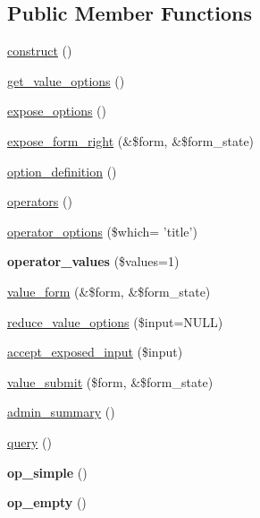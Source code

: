 \subsection*{Public Member Functions}
\begin{CompactItemize}
\item 
\hyperlink{classviews__handler__filter__in__operator_1ec0f531f2c590ef15468ae06c5d0284}{construct} ()
\item 
\hyperlink{classviews__handler__filter__in__operator_a5b5df6d90f4359ed28c0c446bdc81a6}{get\_\-value\_\-options} ()
\item 
\hyperlink{classviews__handler__filter__in__operator_0ed328117721ce41a3744f0339c16527}{expose\_\-options} ()
\item 
\hyperlink{classviews__handler__filter__in__operator_512acf0d0d577f3c87882d08e9808880}{expose\_\-form\_\-right} (\&\$form, \&\$form\_\-state)
\item 
\hyperlink{classviews__handler__filter__in__operator_76892fbc2f6206e88d83925e187c4ab7}{option\_\-definition} ()
\item 
\hyperlink{classviews__handler__filter__in__operator_e22d2c1d388a5b1457960c492ffc1fe1}{operators} ()
\item 
\hyperlink{classviews__handler__filter__in__operator_5b972dd25d26a7010ae9f63cbc926577}{operator\_\-options} (\$which= 'title')
\item 
\hypertarget{classviews__handler__filter__in__operator_90255b49970c7d1a5e77932d8982edfd}{
\textbf{operator\_\-values} (\$values=1)}
\label{classviews__handler__filter__in__operator_90255b49970c7d1a5e77932d8982edfd}

\item 
\hyperlink{classviews__handler__filter__in__operator_6736083657cad0f8c7299b000f2b8e60}{value\_\-form} (\&\$form, \&\$form\_\-state)
\item 
\hyperlink{classviews__handler__filter__in__operator_852f413796906e05a5dca6e839e8e470}{reduce\_\-value\_\-options} (\$input=NULL)
\item 
\hyperlink{classviews__handler__filter__in__operator_ff2b25941729b9ca81e1e53bb8e95a96}{accept\_\-exposed\_\-input} (\$input)
\item 
\hyperlink{classviews__handler__filter__in__operator_f7b01b1f4e53aec7f4b1065606819624}{value\_\-submit} (\$form, \&\$form\_\-state)
\item 
\hyperlink{classviews__handler__filter__in__operator_2c17bde9b5cb3498d31786ba888d545c}{admin\_\-summary} ()
\item 
\hyperlink{classviews__handler__filter__in__operator_f4b9a596ad1e6fbee116977ca0a7d8a9}{query} ()
\item 
\hypertarget{classviews__handler__filter__in__operator_bf6b2578642bcd288425ff9754fec3eb}{
\textbf{op\_\-simple} ()}
\label{classviews__handler__filter__in__operator_bf6b2578642bcd288425ff9754fec3eb}

\item 
\hypertarget{classviews__handler__filter__in__operator_4f78a652b66e9a364e3ff33338796732}{
\textbf{op\_\-empty} ()}
\label{classviews__handler__filter__in__operator_4f78a652b66e9a364e3ff33338796732}

\end{CompactItemize}
